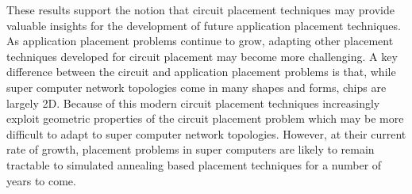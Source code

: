 		These results support the notion that circuit placement techniques may
		provide valuable insights for the development of future application
		placement techniques. As application placement problems continue to grow,
		adapting other placement techniques developed for circuit placement may
		become more challenging. A key difference between the circuit and
		application placement problems is that, while super computer network
		topologies come in many shapes and forms, chips are largely 2D.  Because of
		this modern circuit placement techniques increasingly exploit geometric
		properties of the circuit placement problem which may be more difficult to
		adapt to super computer network topologies.  However, at their current rate
		of growth, placement problems in super computers are likely to remain
		tractable to simulated annealing based placement techniques for a number of
		years to come. 
